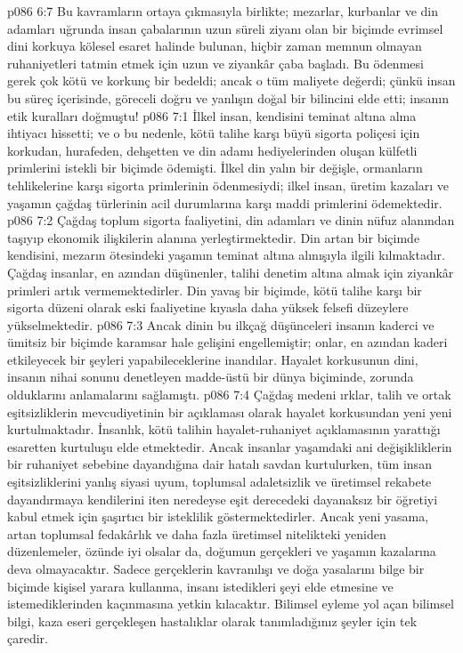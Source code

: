 \vs p086 6:7 Bu kavramların ortaya çıkmasıyla birlikte; mezarlar, kurbanlar ve din adamları uğrunda insan çabalarının uzun süreli ziyanı olan bir biçimde evrimsel dini korkuya kölesel esaret halinde bulunan, hiçbir zaman memnun olmayan ruhaniyetleri tatmin etmek için uzun ve ziyankâr çaba başladı. Bu ödenmesi gerek çok kötü ve korkunç bir bedeldi; ancak o tüm maliyete değerdi; çünkü insan bu süreç içerisinde, göreceli doğru ve yanlışın doğal bir bilincini elde etti; insanın etik kuralları doğmuştu!
\vs p086 7:1 İlkel insan, kendisini teminat altına alma ihtiyacı hissetti; ve o bu nedenle, kötü talihe karşı büyü sigorta poliçesi için korkudan, hurafeden, dehşetten ve din adamı hediyelerinden oluşan külfetli primlerini istekli bir biçimde ödemişti. İlkel din yalın bir değişle, ormanların tehlikelerine karşı sigorta primlerinin ödenmesiydi; ilkel insan, üretim kazaları ve yaşamın çağdaş türlerinin acil durumlarına karşı maddi primlerini ödemektedir.
\vs p086 7:2 Çağdaş toplum sigorta faaliyetini, din adamları ve dinin nüfuz alanından taşıyıp ekonomik ilişkilerin alanına yerleştirmektedir. Din artan bir biçimde kendisini, mezarın ötesindeki yaşamın teminat altına alınışıyla ilgili kılmaktadır. Çağdaş insanlar, en azından düşünenler, talihi denetim altına almak için ziyankâr primleri artık vermemektedirler. Din yavaş bir biçimde, kötü talihe karşı bir sigorta düzeni olarak eski faaliyetine kıyasla daha yüksek felsefi düzeylere yükselmektedir.
\vs p086 7:3 Ancak dinin bu ilkçağ düşünceleri insanın kaderci ve ümitsiz bir biçimde karamsar hale gelişini engellemiştir; onlar, en azından kaderi etkileyecek bir şeyleri yapabileceklerine inandılar. Hayalet korkusunun dini, insanın nihai sonunu denetleyen madde\hyp{}üstü bir dünya biçiminde,  zorunda olduklarını anlamalarını sağlamıştı.
\vs p086 7:4 Çağdaş medeni ırklar, talih ve ortak eşitsizliklerin mevcudiyetinin bir açıklaması olarak hayalet korkusundan yeni yeni kurtulmaktadır. İnsanlık, kötü talihin hayalet\hyp{}ruhaniyet açıklamasının yarattığı esaretten kurtuluşu elde etmektedir. Ancak insanlar yaşamdaki ani değişikliklerin bir ruhaniyet sebebine dayandığına dair hatalı savdan kurtulurken, tüm insan eşitsizliklerini yanlış siyasi uyum, toplumsal adaletsizlik ve üretimsel rekabete dayandırmaya kendilerini iten neredeyse eşit derecedeki dayanaksız bir öğretiyi kabul etmek için şaşırtıcı bir isteklilik göstermektedirler. Ancak yeni yasama, artan toplumsal fedakârlık ve daha fazla üretimsel nitelikteki yeniden düzenlemeler, özünde iyi olsalar da, doğumun gerçekleri ve yaşamın kazalarına deva olmayacaktır. Sadece gerçeklerin kavranılışı ve doğa yasalarını bilge bir biçimde kişisel yarara kullanma, insanı istedikleri şeyi elde etmesine ve istemediklerinden kaçınmasına yetkin kılacaktır. Bilimsel eyleme yol açan bilimsel bilgi, kaza eseri gerçekleşen hastalıklar olarak tanımladığınız şeyler için tek çaredir.
